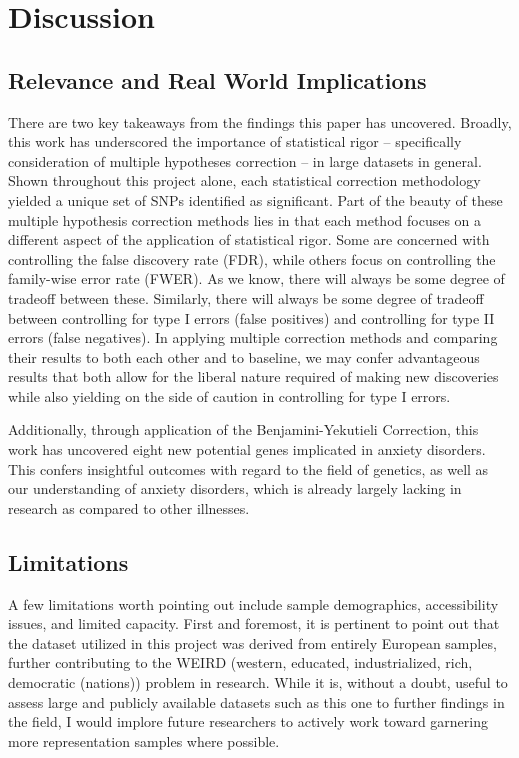 \documentclass[12pt]{article}
\begin{document}
\section{Discussion}
\subsection{Relevance and Real World Implications}
There are two key takeaways from the findings this paper has uncovered. Broadly, this work has underscored the importance of statistical rigor -- specifically consideration of multiple hypotheses correction -- in large datasets in general. Shown throughout this project alone, each statistical correction methodology yielded a unique set of SNPs identified as significant. Part of the beauty of these multiple hypothesis correction methods lies in that each method focuses on a different aspect of the application of statistical rigor. Some are concerned with controlling the false discovery rate (FDR), while others focus on controlling the family-wise error rate (FWER). As we know, there will always be some degree of tradeoff between these. Similarly, there will always be some degree of tradeoff between controlling for type I errors (false positives) and controlling for type II errors (false negatives). In applying multiple correction methods and comparing their results to both each other and to baseline, we may confer advantageous results that both allow for the liberal nature required of making new discoveries while also yielding on the side of caution in controlling for type I errors. \par

Additionally, through application of the Benjamini-Yekutieli Correction, this work has uncovered eight new potential genes implicated in anxiety disorders. This confers insightful outcomes with regard to the field of genetics, as well as our understanding of anxiety disorders, which is already largely lacking in research as compared to other illnesses. \par

\subsection{Limitations}
A few limitations worth pointing out include sample demographics, accessibility issues, and limited capacity. First and foremost, it is pertinent to point out that the dataset utilized in this project was derived from entirely European samples, further contributing to the WEIRD (western, educated, industrialized, rich, democratic (nations)) problem in research. While it is, without a doubt, useful to assess large and publicly available datasets such as this one to further findings in the field, I would implore future researchers to actively work toward garnering more representation samples where possible. \par
\end{document}
